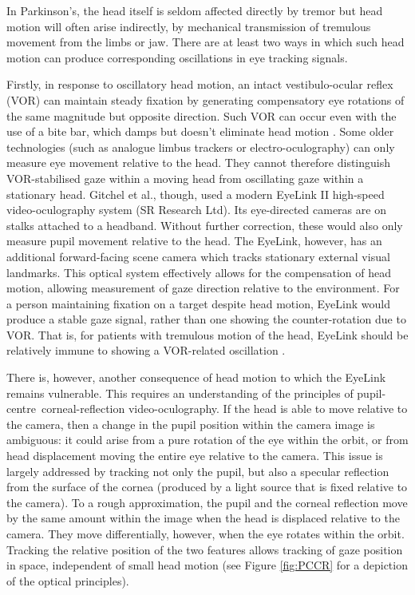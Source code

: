 \documentclass[jou,a4paper]{apa6}
\begin{document}
In Parkinson's, the head itself is seldom affected directly by tremor but head motion will often arise indirectly, by mechanical transmission of tremulous movement from the limbs or jaw. There are at least two ways in which such head motion can produce corresponding oscillations in eye tracking signals. 

Firstly, in response to oscillatory head motion, an intact vestibulo-ocular reflex (VOR) can maintain steady fixation by generating compensatory eye rotations of the same magnitude but opposite direction. Such VOR can occur even with the use of a bite bar, which damps but doesn't eliminate head motion \citep{Saifee2014Tremor-of-the-e}. Some older technologies (such as analogue limbus trackers or electro-oculography) can only measure eye movement relative to the head. They cannot therefore distinguish VOR-stabilised gaze within a moving head from oscillating gaze within a stationary head. Gitchel et al., though, used a modern EyeLink II high-speed video-oculography system (SR Research Ltd). Its eye-directed cameras are on stalks attached to a headband. Without further correction, these would also only measure pupil movement relative to the head. The EyeLink, however, has an additional forward-facing scene camera which tracks stationary external visual landmarks. This optical system effectively allows for the compensation of head motion, allowing measurement of gaze direction relative to the environment. For a person maintaining fixation on a target despite head motion, EyeLink would produce a stable gaze signal, rather than one showing the counter-rotation due to VOR. That is, for patients with tremulous motion of the head, EyeLink should be relatively immune to showing a VOR-related oscillation \citep[counter to ourselves and others previously implicating the VOR as being the artefactual basis of ``ocular tremor'' ][]{Kaski2013Eye-oscillation,Kaski2013Ocular-tremor-i,MacAskill2013Ocular-tremor-i}.

There is, however, another consequence of head motion to which the EyeLink remains vulnerable. This requires an understanding of the principles of pupil-centre~corneal-reflection video-oculography. If the head is able to move relative to the camera, then a change in the pupil position within the camera image is ambiguous: it could arise from a pure rotation of the eye within the orbit, or from head displacement moving the entire eye relative to the camera. This issue is largely addressed by tracking not only the pupil, but also a specular reflection from the surface of the cornea (produced by a light source that is fixed relative to the camera). To a rough approximation, the pupil and the corneal reflection move by the same amount within the image when the head is displaced relative to the camera. They move differentially, however, when the eye rotates within the orbit. Tracking the relative position of the two features allows tracking of gaze position in space, independent of small head motion (see Figure \ref{fig:PCCR} for a depiction of the optical principles).
\end{document}
